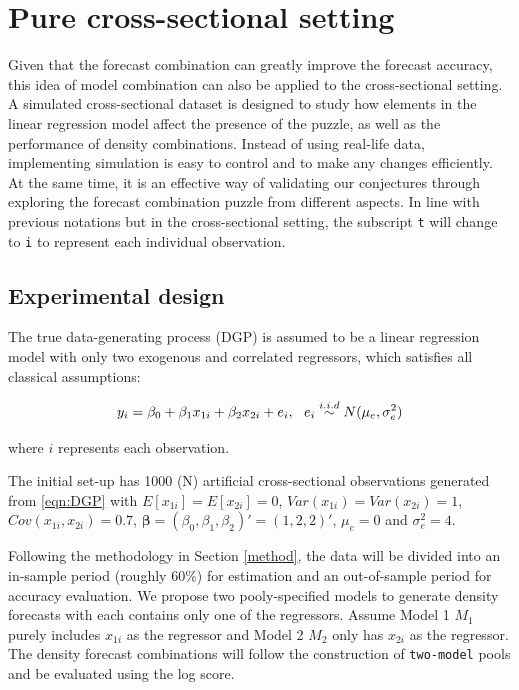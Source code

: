 \documentclass{monashthesis}
\begin{document}
\hypertarget{pure-cross-sectional-setting}{%
\section{Pure cross-sectional setting}\label{pure-cross-sectional-setting}}

Given that the forecast combination can greatly improve the forecast accuracy, this idea of model combination can also be applied to the cross-sectional setting. A simulated cross-sectional dataset is designed to study how elements in the linear regression model affect the presence of the puzzle, as well as the performance of density combinations. Instead of using real-life data, implementing simulation is easy to control and to make any changes efficiently. At the same time, it is an effective way of validating our conjectures through exploring the forecast combination puzzle from different aspects. In line with previous notations but in the cross-sectional setting, the subscript \texttt{t} will change to \texttt{i} to represent each individual observation.

\hypertarget{experimental-design}{%
\subsection{Experimental design}\label{experimental-design}}

The true data-generating process (DGP) is assumed to be a linear regression model with only two exogenous and correlated regressors, which satisfies all classical assumptions:

\begin{equation}
\label{eqn:DGP}
y_i = \beta_0 + \beta_1 x_{1i} + \beta_2 x_{2i} + e_i, \ \ e_i \stackrel{i.i.d}{\sim} N(\mu_e,\sigma^2_e) \\
\end{equation}

where \(i\) represents each observation.

The initial set-up has 1000 (N) artificial cross-sectional observations generated from \ref{eqn:DGP} with \(E[x_{1i}] = E[x_{2i}] = 0\), \(Var(x_{1i}) = Var(x_{2i}) = 1\), \(Cov(x_{1i}, x_{2i}) = 0.7\), \(\pmb{\beta} = (\beta_0, \beta_1, \beta_2)' = (1,2,2)'\), \(\mu_e = 0\) and \(\sigma^2_e=4\).

Following the methodology in Section \ref{method}, the data will be divided into an in-sample period (roughly 60\%) for estimation and an out-of-sample period for accuracy evaluation. We propose two pooly-specified models to generate density forecasts with each contains only one of the regressors. Assume Model 1 \(M_1\) purely includes \(x_{1i}\) as the regressor and Model 2 \(M_2\) only has \(x_{2i}\) as the regressor. The density forecast combinations will follow the construction of \texttt{two-model} pools and be evaluated using the log score.
\end{document}
